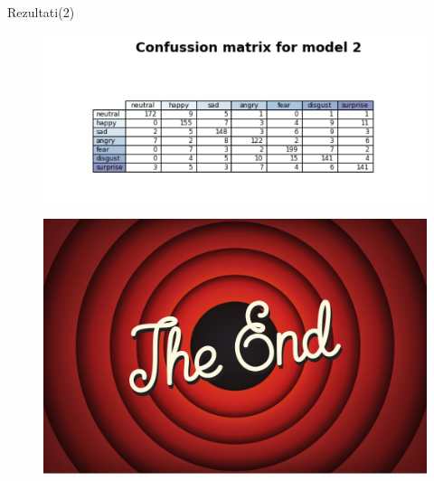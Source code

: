 \documentclass{beamer}
\begin{document}
\begin{frame}{Rezultati(2)}
\begin{figure}[t]
\centering
\includegraphics[scale=0.5]{matrix2.png}
\end{figure}    
\end{frame}

\begin{frame}{}
\begin{figure}[h]
\includegraphics[scale=0.3]{end.jpg}
\end{figure}    

\end{frame}
\end{document}
